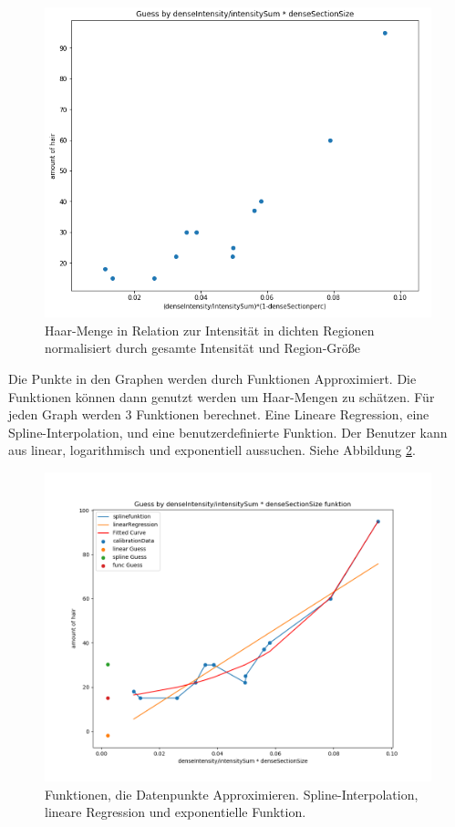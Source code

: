 \documentclass[german,a4paper,12pt,smallheadings,headsepline, titlepage, liststotoc, idextotoc,bibtoctoc,blibliography = totocnumbered]{scrartcl}
\begin{document}
\begin{figure}
	\centering
	\includegraphics[width=1.2\textwidth]{fig64/gh4.PNG}
	\caption[]{Haar-Menge in Relation zur Intensität in dichten Regionen normalisiert durch gesamte Intensität und Region-Größe}
	\label{fig:mapping}
\end{figure}

Die Punkte in den Graphen werden durch Funktionen Approximiert. Die Funktionen können dann genutzt werden um Haar-Mengen zu schätzen.
Für jeden Graph werden 3 Funktionen berechnet. Eine Lineare Regression, eine Spline-Interpolation, und eine benutzerdefinierte Funktion.
Der Benutzer kann aus linear, logarithmisch und exponentiell aussuchen.
Siehe Abbildung \ref{fig:func}.

\begin{figure}
	\centering
	\includegraphics[width=1.2\textwidth]{fig64/g11_denseIntensitynorm.png}
	\caption[]{Funktionen, die Datenpunkte Approximieren. Spline-Interpolation, lineare Regression und exponentielle Funktion.}
	\label{fig:func}
\end{figure} 
\end{document}
